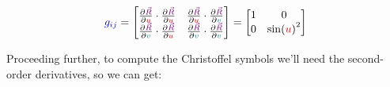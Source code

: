 \begin{equation}
    \begingroup\color{blue}g_{ij}\endgroup = 
    \begin{bmatrix}
        \frac{\partial \begingroup\color{violet}\vec{R}\endgroup}{\partial \begingroup\color{red}u\endgroup} \cdot \frac{\partial \begingroup\color{violet}\vec{R}\endgroup}{\partial \begingroup\color{red}u\endgroup} & \frac{\partial \begingroup\color{violet}\vec{R}\endgroup}{\partial \begingroup\color{red}u\endgroup} \cdot \frac{\partial \begingroup\color{violet}\vec{R}\endgroup}{\partial \begingroup\color{teal}v\endgroup}\\
        \frac{\partial \begingroup\color{violet}\vec{R}\endgroup}{\partial \begingroup\color{teal}v\endgroup} \cdot \frac{\partial \begingroup\color{violet}\vec{R}\endgroup}{\partial \begingroup\color{red}u\endgroup} & \frac{\partial \begingroup\color{violet}\vec{R}\endgroup}{\partial \begingroup\color{teal}v\endgroup} \cdot \frac{\partial \begingroup\color{violet}\vec{R}\endgroup}{\partial \begingroup\color{teal}v\endgroup}
    \end{bmatrix} = 
    \begin{bmatrix}
        1 & 0\\
        0 & \sin(\begingroup\color{red}u\endgroup)^2
    \end{bmatrix}
\end{equation}

Proceeding further, to compute the Christoffel symbols we'll need the second-order derivatives, so we can get:

